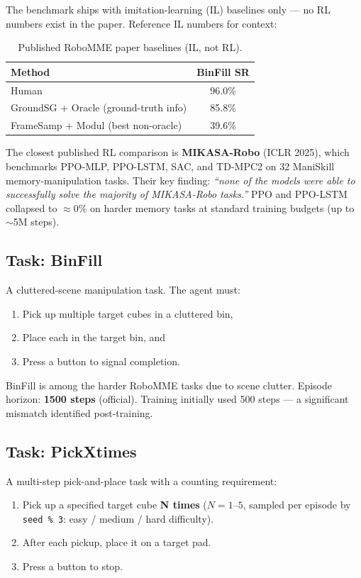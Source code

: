 \documentclass[11pt,letterpaper]{article}
\begin{document}
The benchmark ships with imitation-learning (IL) baselines only — no RL
numbers exist in the paper. Reference IL numbers for context:

\begin{table}[H]
\centering
\begin{tabular}{lc}
\toprule
\textbf{Method} & \textbf{BinFill SR} \\
\midrule
Human & 96.0\% \\
GroundSG + Oracle (ground-truth info) & 85.8\% \\
FrameSamp + Modul (best non-oracle) & 39.6\% \\
\bottomrule
\end{tabular}
\caption{Published RoboMME paper baselines (IL, not RL).}
\end{table}

The closest published RL comparison is \textbf{MIKASA-Robo} (ICLR 2025), which
benchmarks PPO-MLP, PPO-LSTM, SAC, and TD-MPC2 on 32 ManiSkill memory-manipulation
tasks. Their key finding: \emph{``none of the models were able to successfully
solve the majority of MIKASA-Robo tasks.''} PPO and PPO-LSTM collapsed to $\approx$0\%
on harder memory tasks at standard training budgets (up to $\sim$5M steps).

\subsection{Task: BinFill}
\label{sec:binfill-task}

A cluttered-scene manipulation task. The agent must:
\begin{enumerate}[nosep]
  \item Pick up multiple target cubes in a cluttered bin,
  \item Place each in the target bin, and
  \item Press a button to signal completion.
\end{enumerate}
BinFill is among the harder RoboMME tasks due to scene clutter.
Episode horizon: \textbf{1500 steps} (official). Training initially used 500 steps
— a significant mismatch identified post-training.

\subsection{Task: PickXtimes}
\label{sec:pickxtimes-task}

A multi-step pick-and-place task with a counting requirement:
\begin{enumerate}[nosep]
  \item Pick up a specified target cube \textbf{N times} ($N = 1$–$5$, sampled
        per episode by \texttt{seed \% 3}: easy / medium / hard difficulty).
  \item After each pickup, place it on a target pad.
  \item Press a button to stop.
\end{enumerate}
\end{document}
